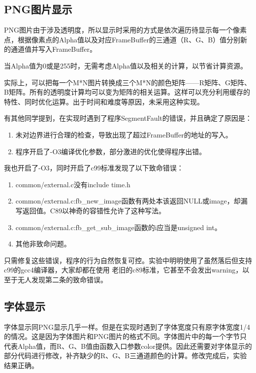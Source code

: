 \documentclass{report}
\begin{document}
\subsection{PNG图片显示}
\par PNG图片由于涉及透明度，所以显示时采用的方式是依次遍历待显示每一个像素点，根据像素点的Alpha值以及对应FrameBuffer的三通道（R、G、B）值分别新的通道值并写入FrameBuffer。
\par 当Alpha值为0或是255时，无需考虑Alpha值以及相关的计算，以节省计算资源。
\par 实际上，可以把每一个M*N图片转换成三个M*N的颜色矩阵——R矩阵、G矩阵、B矩阵。所有的透明度计算均可以变为矩阵的相关运算。这样可以充分利用缓存的特性、同时优化运算。出于时间和难度等原因，未采用这种实现。
\par 有其他同学提到，在实现时遇到了程序SegmentFault的错误，并且确定了原因是：

\begin{enumerate}
    \item 未对边界进行合理的检查，导致出现了超过FrameBuffer的地址的写入。
    \item 程序开启了-O3编译优化参数，部分激进的优化使得程序出错。
\end{enumerate}
\par {}我也开启了-O3，同时开启了c99标准发现了以下致命错误：

\begin{enumerate}
    \item common/external.c没有include time.h
    \item common/external.c:fb\_new\_image函数有两处本该返回NULL或image，却漏写返回值。C89以神奇的容错性允许了这种写法。
    \item common/external.c:fb\_get\_sub\_image函数的i应当是unsigned int。
    \item 其他非致命问题。
\end{enumerate}

只需修复这些错误，程序的行为自然恢复可控。实验中明明使用了虽然落后但支持c99的gcc4编译器，大家却都在使用
老旧的c89标准，它甚至不会发出warning，以至于无人发现第二条的致命错误。


\subsection{字体显示}
\par 字体显示同PNG显示几乎一样。但是在实现时遇到了字体宽度只有原字体宽度1/4的情况。这是因为字体图片和PNG图片的格式不同。字体图片中的每一个字节只代表Alpha值，而R、G、B值由函数入口参数color提供。因此还需要对字体显示的部分代码进行修改，补齐缺少的R、G、B三通道颜色的计算。修改完成后，实验结果正确。
\end{document}
